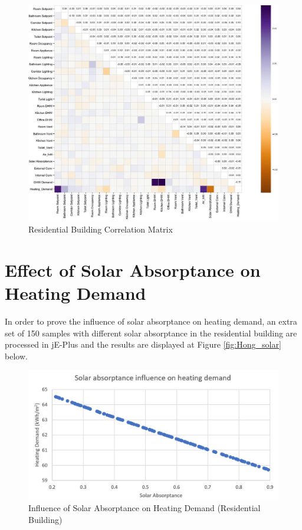 \documentclass[a4paper, oneside]{discothesis}
\begin{document}
	    \begin{figure}[H]
		\centering
		\includegraphics[scale=0.6]{Hongger_Matrix.jpg}
		\caption{Residential Building Correlation Matrix}
		\label{fig:Hongg_Matrix}
		\end{figure}


  	
    \section{Effect of Solar Absorptance on Heating Demand}
			In order to prove the influence of solar absorptance on heating demand, an extra set of 150 samples with different solar absorptance in the residential building are processed in jE-Plus and the results are displayed at Figure \ref{fig:Hong_solar} below.\\
			
    	    \begin{figure}[htbp]
    		\centering
    		\includegraphics[scale=0.5]{Solar_HeatingDemand.JPG}
    		\caption{Influence of Solar Absorptance on Heating Demand (Residential Building)}
    		\label{fig:Hongg_solar}
    		\end{figure}			
        
\end{document}
